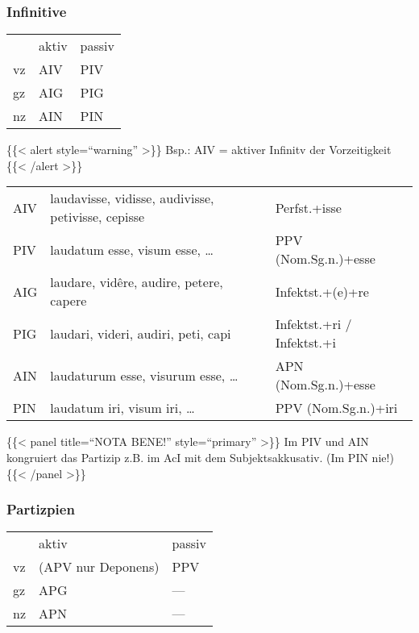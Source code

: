 \documentclass{scrartcl}
\begin{document}
\subsubsection{Infinitive}
\label{sec:orge1784ac}

\begin{center}
\begin{tabular}{lll}
 & aktiv & passiv\\
vz & AIV & PIV\\
gz & AIG & PIG\\
nz & AIN & PIN\\
\end{tabular}
\end{center}


\{\{< alert style="`warning"' >\}\} Bsp.: AIV = aktiver Infinitv der Vorzeitigkeit \{\{< /alert >\}\}


\begin{center}
\begin{tabular}{lll}
AIV & laudavisse, vidisse, audivisse, petivisse, cepisse & Perfst.+isse\\
PIV & laudatum esse, visum esse, \ldots{} & PPV (Nom.Sg.n.)+esse\\
AIG & laudare, vidêre, audire, petere, capere & Infektst.+(e)+re\\
PIG & laudari, videri, audiri, peti, capi & Infektst.+ri / Infektst.+i\\
AIN & laudaturum esse, visurum esse, \ldots{} & APN (Nom.Sg.n.)+esse\\
PIN & laudatum iri, visum iri, \ldots{} & PPV (Nom.Sg.n.)+iri\\
\end{tabular}
\end{center}


\{\{< panel title="`NOTA BENE!"' style="`primary"' >\}\} Im PIV und AIN kongruiert das Partizip z.B. im AcI mit dem Subjektsakkusativ. (Im PIN nie!) \{\{< /panel >\}\}



\subsubsection{Partizpien}
\label{sec:orgda20415}

\begin{center}
\begin{tabular}{lll}
 & aktiv & passiv\\
vz & (APV nur Deponens) & PPV\\
gz & APG & ---\\
nz & APN & ---\\
\end{tabular}
\end{center}
\end{document}
